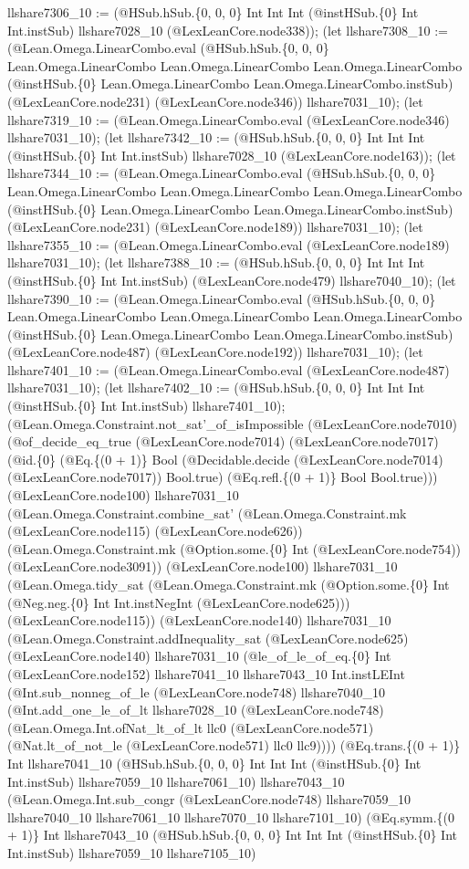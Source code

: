 \documentclass[11pt]{article}
\begin{document}
llshare7306\_10 := (@HSub.hSub.\{0, 0, 0\} Int Int Int (@instHSub.\{0\} Int Int.instSub) llshare7028\_10 (@LexLeanCore.node338)); (let llshare7308\_10 := (@Lean.Omega.LinearCombo.eval (@HSub.hSub.\{0, 0, 0\} Lean.Omega.LinearCombo Lean.Omega.LinearCombo Lean.Omega.LinearCombo (@instHSub.\{0\} Lean.Omega.LinearCombo Lean.Omega.LinearCombo.instSub) (@LexLeanCore.node231) (@LexLeanCore.node346)) llshare7031\_10); (let llshare7319\_10 := (@Lean.Omega.LinearCombo.eval (@LexLeanCore.node346) llshare7031\_10); (let llshare7342\_10 := (@HSub.hSub.\{0, 0, 0\} Int Int Int (@instHSub.\{0\} Int Int.instSub) llshare7028\_10 (@LexLeanCore.node163)); (let llshare7344\_10 := (@Lean.Omega.LinearCombo.eval (@HSub.hSub.\{0, 0, 0\} Lean.Omega.LinearCombo Lean.Omega.LinearCombo Lean.Omega.LinearCombo (@instHSub.\{0\} Lean.Omega.LinearCombo Lean.Omega.LinearCombo.instSub) (@LexLeanCore.node231) (@LexLeanCore.node189)) llshare7031\_10); (let llshare7355\_10 := (@Lean.Omega.LinearCombo.eval (@LexLeanCore.node189) llshare7031\_10); (let llshare7388\_10 := (@HSub.hSub.\{0, 0, 0\} Int Int Int (@instHSub.\{0\} Int Int.instSub) (@LexLeanCore.node479) llshare7040\_10); (let llshare7390\_10 := (@Lean.Omega.LinearCombo.eval (@HSub.hSub.\{0, 0, 0\} Lean.Omega.LinearCombo Lean.Omega.LinearCombo Lean.Omega.LinearCombo (@instHSub.\{0\} Lean.Omega.LinearCombo Lean.Omega.LinearCombo.instSub) (@LexLeanCore.node487) (@LexLeanCore.node192)) llshare7031\_10); (let llshare7401\_10 := (@Lean.Omega.LinearCombo.eval (@LexLeanCore.node487) llshare7031\_10); (let llshare7402\_10 := (@HSub.hSub.\{0, 0, 0\} Int Int Int (@instHSub.\{0\} Int Int.instSub) llshare7401\_10); (@Lean.Omega.Constraint.not\_sat'\_of\_isImpossible (@LexLeanCore.node7010) (@of\_decide\_eq\_true (@LexLeanCore.node7014) (@LexLeanCore.node7017) (@id.\{0\} (@Eq.\{(0 + 1)\} Bool (@Decidable.decide (@LexLeanCore.node7014) (@LexLeanCore.node7017)) Bool.true) (@Eq.refl.\{(0 + 1)\} Bool Bool.true))) (@LexLeanCore.node100) llshare7031\_10 (@Lean.Omega.Constraint.combine\_sat' (@Lean.Omega.Constraint.mk (@LexLeanCore.node115) (@LexLeanCore.node626)) (@Lean.Omega.Constraint.mk (@Option.some.\{0\} Int (@LexLeanCore.node754)) (@LexLeanCore.node3091)) (@LexLeanCore.node100) llshare7031\_10 (@Lean.Omega.tidy\_sat (@Lean.Omega.Constraint.mk (@Option.some.\{0\} Int (@Neg.neg.\{0\} Int Int.instNegInt (@LexLeanCore.node625))) (@LexLeanCore.node115)) (@LexLeanCore.node140) llshare7031\_10 (@Lean.Omega.Constraint.addInequality\_sat (@LexLeanCore.node625) (@LexLeanCore.node140) llshare7031\_10 (@le\_of\_le\_of\_eq.\{0\} Int (@LexLeanCore.node152) llshare7041\_10 llshare7043\_10 Int.instLEInt (@Int.sub\_nonneg\_of\_le (@LexLeanCore.node748) llshare7040\_10 (@Int.add\_one\_le\_of\_lt llshare7028\_10 (@LexLeanCore.node748) (@Lean.Omega.Int.ofNat\_lt\_of\_lt llc0 (@LexLeanCore.node571) (@Nat.lt\_of\_not\_le (@LexLeanCore.node571) llc0 llc9)))) (@Eq.trans.\{(0 + 1)\} Int llshare7041\_10 (@HSub.hSub.\{0, 0, 0\} Int Int Int (@instHSub.\{0\} Int Int.instSub) llshare7059\_10 llshare7061\_10) llshare7043\_10 (@Lean.Omega.Int.sub\_congr (@LexLeanCore.node748) llshare7059\_10 llshare7040\_10 llshare7061\_10 llshare7070\_10 llshare7101\_10) (@Eq.symm.\{(0 + 1)\} Int llshare7043\_10 (@HSub.hSub.\{0, 0, 0\} Int Int Int (@instHSub.\{0\} Int Int.instSub) llshare7059\_10 llshare7105\_10) 
\end{document}
